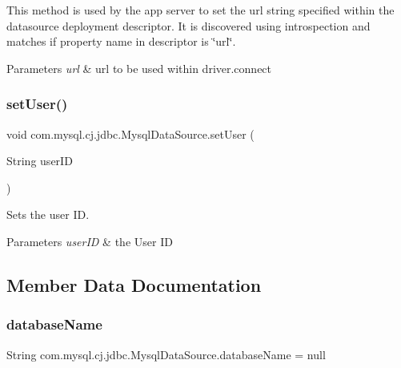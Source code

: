 This method is used by the app server to set the url string specified within the datasource deployment descriptor. It is discovered using introspection and matches if property name in descriptor is \char`\"{}url\char`\"{}.


\begin{DoxyParams}{Parameters}
{\em url} & url to be used within driver.\+connect \\
\hline
\end{DoxyParams}
\mbox{\label{classcom_1_1mysql_1_1cj_1_1jdbc_1_1_mysql_data_source_a34a8c203cf757fa8e40e88e5af2cff0b}} 
\subsubsection{\texorpdfstring{set\+User()}{setUser()}}
{\footnotesize\ttfamily void com.\+mysql.\+cj.\+jdbc.\+Mysql\+Data\+Source.\+set\+User (\begin{DoxyParamCaption}\item[{String}]{user\+ID }\end{DoxyParamCaption})}

Sets the user ID.


\begin{DoxyParams}{Parameters}
{\em user\+ID} & the User ID \\
\hline
\end{DoxyParams}


\subsection{Member Data Documentation}
\mbox{\label{classcom_1_1mysql_1_1cj_1_1jdbc_1_1_mysql_data_source_a033e1f8834e4452b6875af6824350566}} 
\subsubsection{\texorpdfstring{database\+Name}{databaseName}}
{\footnotesize\ttfamily String com.\+mysql.\+cj.\+jdbc.\+Mysql\+Data\+Source.\+database\+Name = null\hspace{0.3cm}{\ttfamily [protected]}}

